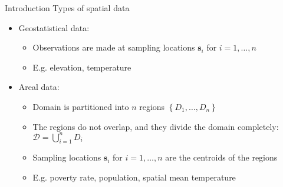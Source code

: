 \documentclass[12pt,t]{beamer}
\newcommand{\subt}[1]{{\footnotesize \color{subtitle} {#1}}}
\begin{document}
\begin{frame}{Introduction}
\subt{Types of spatial data}

\bigskip
\begin{itemize}
    \item Geostatistical data:
    \begin{itemize}
        \item Observations are made at sampling locations $\bm{s}_i$ for $i = 1, \dots, n$
        \item E.g. elevation, temperature
    \end{itemize}
    \item Areal data:
    \begin{itemize}
        \item Domain is partitioned into $n$ regions $\left\{ D_1, \dots, D_n \right\}$
        \item The regions do not overlap, and they divide the domain completely: $\mathcal{D} = \bigcup_{i=1}^n D_i$
        \item Sampling locations $\bm{s}_i$ for $i = 1, \dots, n$ are the centroids of the regions
        \item E.g. poverty rate, population, spatial mean temperature
    \end{itemize}
\end{itemize}


\end{frame}
\end{document}
